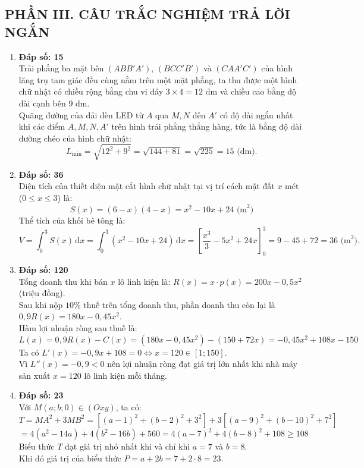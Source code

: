 \documentclass[12pt,a4paper]{article}
\begin{document}
\subsection*{PHẦN III. CÂU TRẮC NGHIỆM TRẢ LỜI NGẮN}

\begin{enumerate}[label=\textbf{Câu \arabic*:}, leftmargin=*]

\item \textbf{Đáp số: 15}\\
Trải phẳng ba mặt bên $(ABB'A')$, $(BCC'B')$ và $(CAA'C')$ của hình lăng trụ tam giác đều cùng nằm trên một mặt phẳng, ta thu được một hình chữ nhật có chiều rộng bằng chu vi đáy $3 \times 4 = 12\text{ dm}$ và chiều cao bằng độ dài cạnh bên $9\text{ dm}$.\\
Quãng đường của dải đèn LED từ $A$ qua $M, N$ đến $A'$ có độ dài ngắn nhất khi các điểm $A, M, N, A'$ trên hình trải phẳng thẳng hàng, tức là bằng độ dài đường chéo của hình chữ nhật:
$$L_{\min} = \sqrt{12^2 + 9^2} = \sqrt{144 + 81} = \sqrt{225} = 15\text{ (dm)}.$$

\item \textbf{Đáp số: 36}\\
Diện tích của thiết diện mặt cắt hình chữ nhật tại vị trí cách mặt đất $x\text{ mét}$ ($0 \le x \le 3$) là:
$$S(x) = (6 - x)(4 - x) = x^2 - 10x + 24\text{ (m}^2\text{)}$$
Thể tích của khối bê tông là:
$$V = \int_{0}^{3} S(x)\,\mathrm{d}x = \int_{0}^{3} (x^2 - 10x + 24)\,\mathrm{d}x = \left[\dfrac{x^3}{3} - 5x^2 + 24x\right]_{0}^{3} = 9 - 45 + 72 = 36\text{ (m}^3\text{)}.$$

\item \textbf{Đáp số: 120}\\
Tổng doanh thu khi bán $x$ lô linh kiện là: $R(x) = x\cdot p(x) = 200x - 0{,}5x^2$ (triệu đồng).\\
Sau khi nộp $10\%$ thuế trên tổng doanh thu, phần doanh thu còn lại là $0{,}9R(x) = 180x - 0{,}45x^2$.\\
Hàm lợi nhuận ròng sau thuế là:
$$L(x) = 0{,}9R(x) - C(x) = (180x - 0{,}45x^2) - (150 + 72x) = -0{,}45x^2 + 108x - 150$$
Ta có $L'(x) = -0{,}9x + 108 = 0 \iff x = 120 \in [1; 150]$.\\
Vì $L''(x) = -0{,}9 < 0$ nên lợi nhuận ròng đạt giá trị lớn nhất khi nhà máy sản xuất $x = 120$ lô linh kiện mỗi tháng.

\item \textbf{Đáp số: 23}\\
Với $M(a; b; 0) \in (Oxy)$, ta có:
$$T = MA^2 + 3MB^2 = \left[(a - 1)^2 + (b - 2)^2 + 3^2\right] + 3\left[(a - 9)^2 + (b - 10)^2 + 7^2\right]$$
$$= 4(a^2 - 14a) + 4(b^2 - 16b) + 560 = 4(a - 7)^2 + 4(b - 8)^2 + 108 \ge 108$$
Biểu thức $T$ đạt giá trị nhỏ nhất khi và chỉ khi $a = 7$ và $b = 8$.\\
Khi đó giá trị của biểu thức $P = a + 2b = 7 + 2\cdot 8 = 23$.


\end{enumerate}
\end{document}
